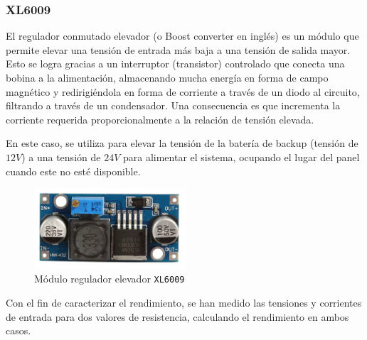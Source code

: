 \subsubsection{XL6009}

El regulador conmutado elevador (o Boost converter en inglés) es un módulo que permite elevar una tensión de entrada más baja a una tensión de salida mayor. Esto se logra gracias a un interruptor (transistor) controlado que conecta una bobina a la alimentación, almacenando mucha energía en forma de campo magnético y redirigiéndola en forma de corriente a través de un diodo al circuito, filtrando a través de un condensador. Una consecuencia es que incrementa la corriente requerida proporcionalmente a la relación de tensión elevada. \cite{xlsemi400KHz604}

En este caso, se utiliza para elevar la tensión de la batería de backup (tensión de $12 V$) a una tensión de $24 V$ para alimentar el sistema, ocupando el lugar del panel cuando este no esté disponible.

\begin{figure}[H]
    \centering
    \includegraphics[width=0.5\textwidth]{images/2-hardware/componentes/XL6009.png}
    \caption{Módulo regulador elevador \texttt{XL6009}}
    \label{fig:hardware/modulos/xl6009}
\end{figure}

Con el fin de caracterizar el rendimiento, se han medido las tensiones y corrientes de entrada para dos valores de resistencia, calculando el rendimiento en ambos casos.

